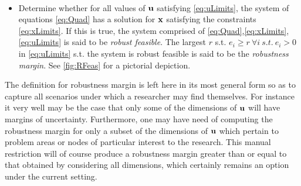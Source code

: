 \begin{cdef}
\label{RobustDef}\ \\
\begin{itemize} 
	\item Determine whether for all values of $\bold u$ satisfying \eqref{eq:uLimits}, the system of equations \eqref{eq:Quad} has a solution for $\bold x$ satisfying the constraints \eqref{eq:xLimits}. 
If this is true, the system comprised of \eqref{eq:Quad},\eqref{eq:xLimits},\eqref{eq:uLimits} is said to be \emph{robust feasible}. 
The largest $r$ s.t. $e_i\geq r \ \forall i \ s.t. \ e_i>0$ in \eqref{eq:uLimits} s.t. the system is robust feasible is said to be the \emph{robustness margin}. 
See \cref{fig:RFeas} for a pictorial depiction. 
\end{itemize}

\end{cdef}

The definition for robustness margin is left here in its most general form so as to capture all scenarios under which a researcher may find themselves. 
For instance it very well may be the case that only some of the dimensions of $\bold u$ will have margins of uncertainty. 
Furthermore, one may have need of computing the robustness margin for only a subset of the dimensions of $\bold u$ which pertain to problem areas or nodes of particular interest to the research. 
This manual restriction will of course produce a robustness margin greater than or equal to that obtained by considering all dimensions, which certainly remains an option under the current setting. 
